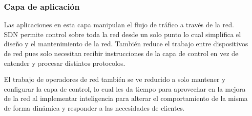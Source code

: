 \documentclass[10pt,journal,compsoc]{IEEEtran}
\begin{document}
%

\subsubsection*{Capa de aplicación}
Las aplicaciones en esta capa manipulan el flujo de tráfico a través de la red. SDN permite control sobre toda la red desde un solo punto lo cual simplifica el diseño y el mantenimiento de la red. También reduce el trabajo entre dispositivos de red pues solo necesitan recibir instrucciones de la capa de control en vez de entender y procesar distintos protocolos.

El trabajo de operadores de red también se ve reducido a solo mantener y configurar la capa de control, lo cual les da tiempo para aprovechar en la mejora de la red al implementar inteligencia para alterar el comportamiento de la misma de forma dinámica y responder a las necesidades de clientes. 
\end{document}
